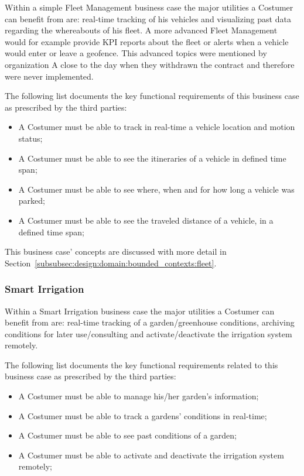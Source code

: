 Within a simple Fleet Management business case the major utilities a Costumer can benefit from are: real-time tracking of his vehicles and visualizing past data regarding the whereabouts of his fleet. A more advanced Fleet Management would for example provide \gls{KPI} reports about the fleet or alerts when a vehicle would enter or leave a geofence. This advanced topics were mentioned by organization A close to the day when they withdrawn the contract and therefore were never implemented.

The following list documents the key functional requirements of this business case as prescribed by the third parties:

\begin{itemize}
    \item A Costumer must be able to track in real-time a vehicle location and motion status;
    \item A Costumer must be able to see the itineraries of a vehicle in defined time span;
    \item A Costumer must be able to see where, when and for how long a vehicle was parked;
    \item A Costumer must be able to see the traveled distance of a vehicle, in a defined time span;
\end{itemize}

This business case' concepts are discussed with more detail in Section~\ref{subsubsec:design:domain:bounded_contexts:fleet}.

\subsubsection{Smart Irrigation}
\label{subsubsec:requirements:functional:costumer:irrigation}

Within a Smart Irrigation business case the major utilities a Costumer can benefit from are: real-time tracking of a garden/greenhouse conditions, archiving conditions for later use/consulting and activate/deactivate the irrigation system remotely.

The following list documents the key functional requirements related to this business case as prescribed by the third parties:

\begin{itemize}
    \item A Costumer must be able to manage his/her garden's information;
    \item A Costumer must be able to track a gardens' conditions in real-time;
    \item A Costumer must be able to see past conditions of a garden;
    \item A Costumer must be able to activate and deactivate the irrigation system remotely;
\end{itemize}

